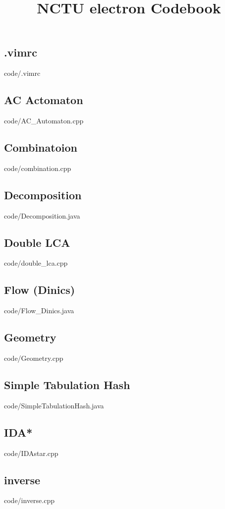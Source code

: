 \documentclass [landscape,10pt,a4paper,twocolumn,nofonts]{article}
\title {NCTU electron Codebook}
\begin{document}
\thispagestyle{fancy}
\tableofcontents
\newpage
\subsection{.vimrc}
 {code/.vimrc}
\subsection{AC Actomaton}
 {code/AC_Automaton.cpp}
\subsection{Combinatoion}
 {code/combination.cpp}
\subsection{Decomposition}
 {code/Decomposition.java}
\subsection{Double LCA}
 {code/double_lca.cpp}
\subsection{Flow (Dinics)}
 {code/Flow_Dinics.java}
\subsection{Geometry}
 {code/Geometry.cpp}
\subsection{Simple Tabulation Hash}
 {code/SimpleTabulationHash.java}
\subsection{IDA*}
 {code/IDAstar.cpp}
\subsection{inverse}
 {code/inverse.cpp}
\end{document}
